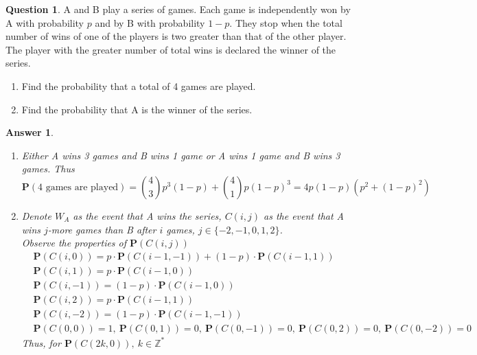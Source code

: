 \documentclass[utf8]{article}
\theoremstyle{definition}%
\newtheorem{question}{Question} %
\theoremstyle{plain}%
\newtheorem{answer}{Answer} %
\begin{document}
\begin{question}
    A and B play a series of games. Each game is independently won by A with probability $p$ and by B with probability $1-p$. They stop when the total number of wins of one of the players is two greater than that of the other player. The player with the greater number of total wins is declared the winner of the series.
    \begin{enumerate}[label=(\alph*)]
        \item Find the probability that a total of 4 games are played. 
        \item Find the probability that A is the winner of the series.
    \end{enumerate}
\end{question}
\begin{answer} ~
    \begin{enumerate}[label=(\alph*)]
        \item Either A wins 3 games and B wins 1 game or A wins 1 game and B wins 3 games. Thus
        \begin{equation}
            \mathbf{P}(\text{4 games are played}) = \binom{4}{3} p^3(1-p) + \binom{4}{1} p(1-p)^3 = 4p(1-p)(p^2 + (1-p)^2)
        \end{equation}
        \item Denote $W_A$ as the event that A wins the series, $C(i,j)$ as the event that A wins $j$-more games than B after $i$ games, $j \in \{-2, -1, 0, 1, 2\}$. \\ 
        Observe the properties of $\mathbf{P}(C(i,j))$
        \begin{equation}
        \begin{aligned}
            &\mathbf{P}(C(i,0)) = p \cdot \mathbf{P}(C(i-1,-1)) + (1-p) \cdot \mathbf{P}(C(i-1,1)) \\
            &\mathbf{P}(C(i,1)) = p \cdot \mathbf{P}(C(i-1,0)) \\
            &\mathbf{P}(C(i,-1)) = (1-p) \cdot \mathbf{P}(C(i-1,0)) \\
            &\mathbf{P}(C(i,2)) = p \cdot \mathbf{P}(C(i-1,1)) \\
            &\mathbf{P}(C(i,-2)) = (1-p) \cdot \mathbf{P}(C(i-1,-1)) \\ 
            &\mathbf{P}(C(0,0)) = 1,~ \mathbf{P}(C(0,1)) = 0,~ \mathbf{P}(C(0,-1)) = 0,~ \mathbf{P}(C(0,2)) = 0,~ \mathbf{P}(C(0,-2)) = 0
        \end{aligned}
        \end{equation}
        Thus, for $\mathbf{P}(C(2k,0)),~k\in\mathbb{Z^*}$

\end{enumerate}
\end{answer}
\end{document}
